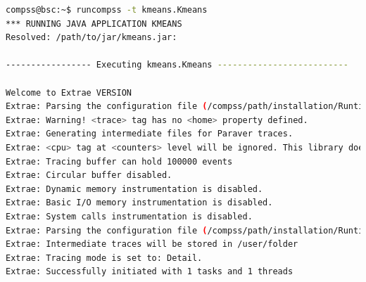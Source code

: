 \begin{lstlisting}[language=bash]
compss@bsc:~$ runcompss -t kmeans.Kmeans
*** RUNNING JAVA APPLICATION KMEANS
Resolved: /path/to/jar/kmeans.jar:

----------------- Executing kmeans.Kmeans --------------------------

Welcome to Extrae VERSION
Extrae: Parsing the configuration file (/compss/path/installation/Runtime/configuration/xml/tracing/extrae_basic.xml) begins
Extrae: Warning! <trace> tag has no <home> property defined.
Extrae: Generating intermediate files for Paraver traces.
Extrae: <cpu> tag at <counters> level will be ignored. This library does not support CPU HW.
Extrae: Tracing buffer can hold 100000 events
Extrae: Circular buffer disabled.
Extrae: Dynamic memory instrumentation is disabled.
Extrae: Basic I/O memory instrumentation is disabled.
Extrae: System calls instrumentation is disabled.
Extrae: Parsing the configuration file (/compss/path/installation/Runtime/configuration/xml/tracing/extrae_basic.xml) has ended
Extrae: Intermediate traces will be stored in /user/folder
Extrae: Tracing mode is set to: Detail.
Extrae: Successfully initiated with 1 tasks and 1 threads


\end{lstlisting}
